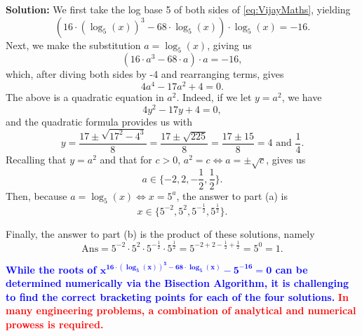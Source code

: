 \textbf{Solution:}  We first take the log base 5 of both sides of \eqref{eq:VijayMaths}, yielding
$$ \left( 16 \cdot \left(\log_5(x) \right)^3 - 68 \cdot \log_5(x)  \right) \cdot \log_5(x) = -16.$$
Next, we make the substitution $a = \log_5(x)$, giving us
$$ \left( 16 \cdot a^3 - 68 \cdot a  \right) \cdot a = -16,$$
which, after diving both sides by -4 and rearranging terms, gives
$$ 4 a^4 - 17a^2 + 4 = 0.$$
The above is a quadratic equation in $a^2$. Indeed, if we let $y = a^2$, we have
$$ 4 y^2 - 17y + 4 = 0,$$
and the quadratic formula provides us with
$$y = \frac{17 \pm \sqrt{17^2 - 4^3}}{8} =\frac{17 \pm \sqrt{225}}{8} = \frac{17 \pm 15}{8} = 4 \text{ and } \frac{1}{4}.$$
Recalling that $y = a^2$ and that for $c>0$, $a^2 = c \iff a = \pm \sqrt{c}$, gives us
$$a \in \{-2, 2, -\frac{1}{2}, \frac{1}{2} \}.$$
Then, because $a = \log_5(x) \iff x = 5^a$, the answer to part (a) is
$$\boxed{ x \in \{5^{-2}, 5^{2}, 5^{-\frac{1}{2}}, 5^{\frac{1}{2}} \}.}$$ 

Finally, the answer to part (b) is the product of these solutions, namely
$$\boxed{\mathrm{Ans} = 5^{-2} \cdot 5^{2} \cdot 5^{-\frac{1}{2}}\cdot 5^{\frac{1}{2}} = 5^{-2 + 2 -\frac{1}{2} +\frac{1}{2}} = 5^0 = 1.}$$

\textcolor{blue}{\bf While the roots of $\bm{x^{16 \cdot \left(\log_5(x) \right)^3 - 68 \cdot \log_5(x) } - 5^{-16}=0}$ can be determined numerically via the Bisection Algorithm, it is challenging to find the correct bracketing points for each of the four solutions.} \textcolor{red}{\bf In many engineering problems, a combination of analytical and numerical prowess is required.} 
\Qed


\bigskip

\begin{center}
\setlength{\fboxrule}{2pt}  %
\end{center}

